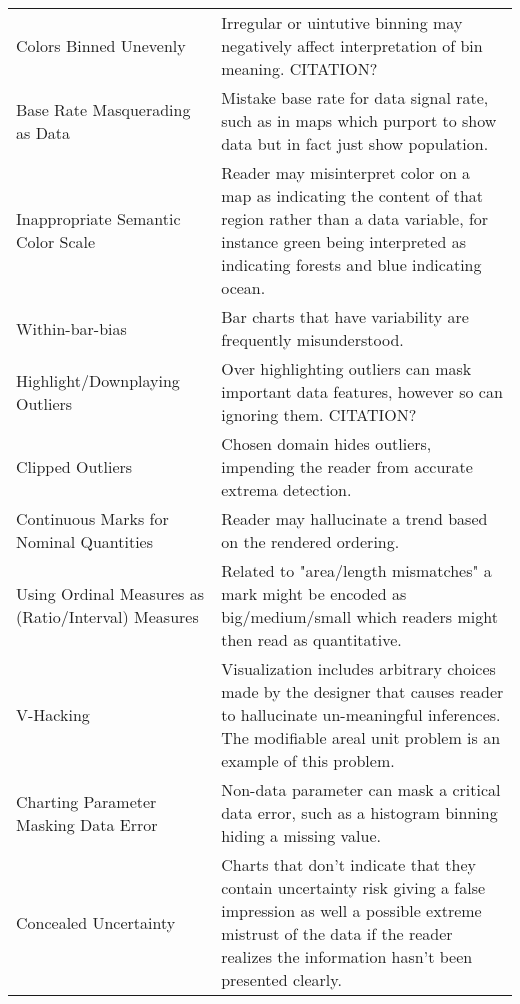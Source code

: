 \begin{table*}[]
\begin{tabular}{p{5cm}p{12cm}}
 \rowcolor{colorc}Colors Binned Unevenly & Irregular or uintutive binning may negatively affect interpretation of bin meaning. CITATION?\\
 \rowcolor{colorc-opaque}Base Rate Masquerading as Data & Mistake base rate for data signal rate, such as in maps which purport to show data but in fact just show population. \cite{correll2016surprise}\\
 \rowcolor{colorc}Inappropriate Semantic Color Scale  & Reader may misinterpret color on a map as indicating the content of that region rather than a data variable, for instance green being interpreted as indicating forests and blue indicating ocean. \\
 \rowcolor{colorc-opaque}Within-bar-bias & Bar charts that have variability are frequently misunderstood. \cite{newman2012bar}\\
 \rowcolor{colorc}Highlight/Downplaying Outliers & Over highlighting outliers can mask important data features, however so can ignoring them. CITATION?\\
 \rowcolor{colorc-opaque}Clipped Outliers & Chosen domain hides outliers, impending the reader from accurate extrema detection. \\
 \rowcolor{colorc}Continuous Marks for Nominal Quantities & Reader may hallucinate a trend based on the rendered ordering. \cite{kindlmann2014algebraic, mcnuttlinting}\\
 \rowcolor{colorc-opaque}Using Ordinal Measures as (Ratio/Interval) Measures & Related to "area/length mismatches" a mark might be encoded as big/medium/small which readers might then read as quantitative. \cite{stevens1946theory, few2019loom}\\
 \rowcolor{colorc}V-Hacking & Visualization includes arbitrary choices made by the designer that causes reader to hallucinate un-meaningful inferences. The modifiable areal unit problem is an example of this problem. \cite{fotheringham1991modifiable, kindlmann2014algebraic}\\
 \rowcolor{colorc-opaque}Charting Parameter Masking Data Error & Non-data parameter can mask a critical data error, such as a histogram binning hiding a missing value. \cite{correll2018looks}\\
 \rowcolor{colorc}Concealed Uncertainty & Charts that don't indicate that they contain uncertainty risk giving a false impression as well a possible extreme mistrust of the data if the reader realizes the information hasn't been presented clearly.  \cite{song2018s, few2019loom, mayrTrust2019, sacha2015role}\\

\end{tabular}
\end{table*}
